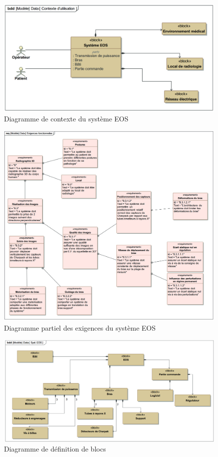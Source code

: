 \begin{figure}[!h]
 \centering \includegraphics[width=0.8\linewidth]{img/td02_04}
 \caption{Diagramme de contexte du système EOS}
 \label{td02_04}
\end{figure}

\begin{figure}[!h]
 \centering \includegraphics[width=0.8\linewidth]{img/td02_05}
 \caption{Diagramme partiel des exigences du système EOS}
 \label{td02_05}
\end{figure}

\begin{figure}[!h]
 \centering \includegraphics[width=0.8\linewidth]{img/td02_06}
 \caption{Diagramme de définition de blocs}
 \label{td02_06}
\end{figure}

